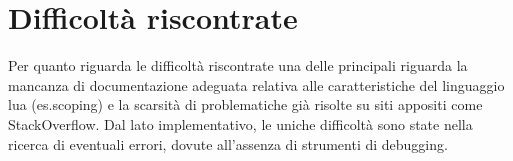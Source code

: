 \documentclass[12pt]{article}
\begin{document}
\section{Difficoltà riscontrate}
Per quanto riguarda le difficoltà riscontrate una delle principali riguarda la mancanza di documentazione adeguata relativa alle caratteristiche del linguaggio lua (es.scoping) e la scarsità di problematiche già risolte su siti appositi come StackOverflow. 
Dal lato implementativo, le uniche difficoltà sono state nella ricerca di eventuali errori, dovute all'assenza di strumenti di debugging.
\end{document}
